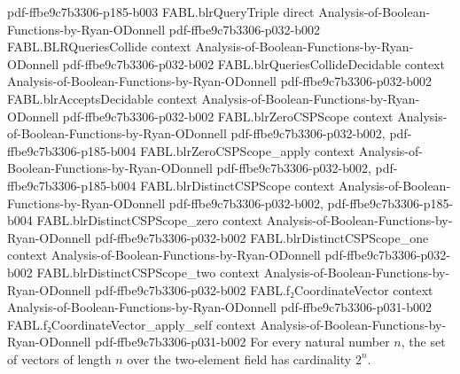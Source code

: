 \begin{theorem}
{    pdf-ffbe9c7b3306-p185-b003}
\proofstep
  {FABL.blrQueryTriple}
  {direct}
  {Analysis-of-Boolean-Functions-by-Ryan-ODonnell}
  {pdf-ffbe9c7b3306-p032-b002}
\proofstep
  {FABL.BLRQueriesCollide}
  {context}
  {Analysis-of-Boolean-Functions-by-Ryan-ODonnell}
  {pdf-ffbe9c7b3306-p032-b002}
\proofstep
  {FABL.blrQueriesCollideDecidable}
  {context}
  {Analysis-of-Boolean-Functions-by-Ryan-ODonnell}
  {pdf-ffbe9c7b3306-p032-b002}
\proofstep
  {FABL.blrAcceptsDecidable}
  {context}
  {Analysis-of-Boolean-Functions-by-Ryan-ODonnell}
  {pdf-ffbe9c7b3306-p032-b002}
\proofstep
  {FABL.blrZeroCSPScope}
  {context}
  {Analysis-of-Boolean-Functions-by-Ryan-ODonnell}
  {pdf-ffbe9c7b3306-p032-b002,
    pdf-ffbe9c7b3306-p185-b004}
\proofstep
  {FABL.blrZeroCSPScope_apply}
  {context}
  {Analysis-of-Boolean-Functions-by-Ryan-ODonnell}
  {pdf-ffbe9c7b3306-p032-b002,
    pdf-ffbe9c7b3306-p185-b004}
\proofstep
  {FABL.blrDistinctCSPScope}
  {context}
  {Analysis-of-Boolean-Functions-by-Ryan-ODonnell}
  {pdf-ffbe9c7b3306-p032-b002,
    pdf-ffbe9c7b3306-p185-b004}
\proofstep
  {FABL.blrDistinctCSPScope_zero}
  {context}
  {Analysis-of-Boolean-Functions-by-Ryan-ODonnell}
  {pdf-ffbe9c7b3306-p032-b002}
\proofstep
  {FABL.blrDistinctCSPScope_one}
  {context}
  {Analysis-of-Boolean-Functions-by-Ryan-ODonnell}
  {pdf-ffbe9c7b3306-p032-b002}
\proofstep
  {FABL.blrDistinctCSPScope_two}
  {context}
  {Analysis-of-Boolean-Functions-by-Ryan-ODonnell}
  {pdf-ffbe9c7b3306-p032-b002}
\proofstep
  {FABL.f₂CoordinateVector}
  {context}
  {Analysis-of-Boolean-Functions-by-Ryan-ODonnell}
  {pdf-ffbe9c7b3306-p031-b002}
\proofstep
  {FABL.f₂CoordinateVector_apply_self}
  {context}
  {Analysis-of-Boolean-Functions-by-Ryan-ODonnell}
  {pdf-ffbe9c7b3306-p031-b002}
For every natural number $n$, the set of vectors of length $n$ over the two-element
field has cardinality $2^n$.
\end{theorem}

